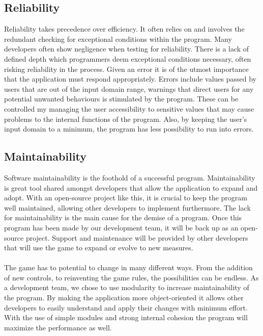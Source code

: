 \documentclass[12pt]{article}
\begin{document}
\subsection{Reliability}
Reliability takes precedence over efficiency. It often relies on and involves the redundant checking for exceptional conditions within the program. Many developers often show negligence when testing for reliability. There is a lack of defined depth which programmers deem exceptional conditions necessary, often risking reliability in the process. Given an error it is of the utmost importance that the application must respond appropriately. Errors include values passed by users that are out of the input domain range, warnings that direct users for any potential unwanted behaviours is stimulated by the program. These can be controlled my managing the user accessibility to sensitive values that may cause problems to the internal functions of the program.  Also, by keeping the user’s input domain to a minimum, the program has less possibility to run into errors. 

\subsection{Maintainability}
Software maintainability is the foothold of a successful program. Maintainability is great tool shared amongst developers that allow the application to expand and adopt. With an open-source project like this, it is crucial to keep the program well maintained, allowing other developers to implement furthermore. The lack for maintainability is the main cause for the demise of a program. Once this program has been made by our development team, it will be back up as an open-source project. Support and maintenance will be provided by other developers that will use the game to expand or evolve to new measures.\\\\
The game has to potential to change in many different ways. From the addition of new controls, to reinventing the game rules, the possibilities can be endless. As a development team, we chose to use modularity to increase maintainability of the program. By making the application more object-oriented it allows other developers to easily understand and apply their changes with minimum effort. With the use of simple modules and strong internal cohesion the program will maximize the performance as well.



\end{document}
